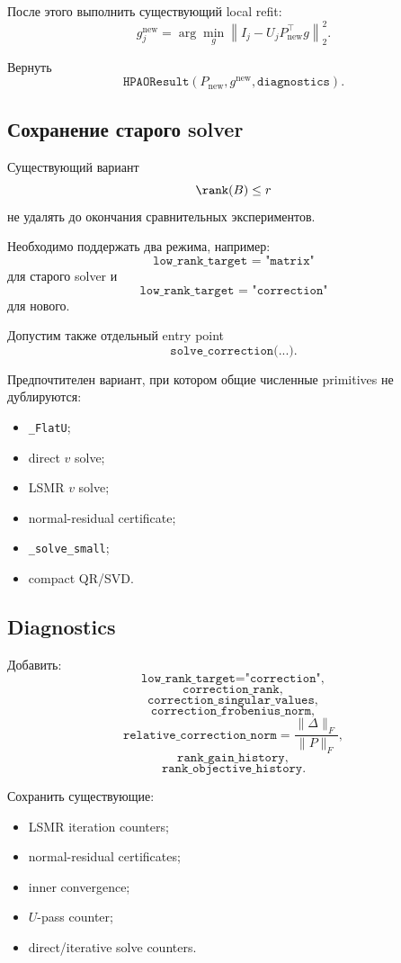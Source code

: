 После этого выполнить существующий local refit:
\[
    g_j^{\mathrm{new}}
    =
    \arg\min_g
    \left\|
        I_j-U_jP_{\mathrm{new}}^\top g
    \right\|_2^2.
\]

Вернуть
\[
    \texttt{HPAOResult}
    \left(
        P_{\mathrm{new}},
        g^{\mathrm{new}},
        \texttt{diagnostics}
    \right).
\]

\subsection{Сохранение старого solver}

Существующий вариант
\[
    \rank(B)\le r
\]
не удалять до окончания сравнительных экспериментов.

Необходимо поддержать два режима, например:
\[
\texttt{low\_rank\_target = "matrix"}
\]
для старого solver и
\[
\texttt{low\_rank\_target = "correction"}
\]
для нового.

Допустим также отдельный entry point
\[
    \texttt{solve\_correction(...)}.
\]

Предпочтителен вариант, при котором общие численные primitives
не дублируются:
\begin{itemize}
    \item \texttt{\_FlatU};
    \item direct $v$ solve;
    \item LSMR $v$ solve;
    \item normal-residual certificate;
    \item \texttt{\_solve\_small};
    \item compact QR/SVD.
\end{itemize}

\subsection{Diagnostics}

Добавить:
\[
    \texttt{low\_rank\_target="correction"},
\]
\[
    \texttt{correction\_rank},
\]
\[
    \texttt{correction\_singular\_values},
\]
\[
    \texttt{correction\_frobenius\_norm},
\]
\[
    \texttt{relative\_correction\_norm}
    =
    \frac{\|\Delta\|_F}{\|P\|_F},
\]
\[
    \texttt{rank\_gain\_history},
\]
\[
    \texttt{rank\_objective\_history}.
\]

Сохранить существующие:
\begin{itemize}
    \item LSMR iteration counters;
    \item normal-residual certificates;
    \item inner convergence;
    \item $U$-pass counter;
    \item direct/iterative solve counters.
\end{itemize}

